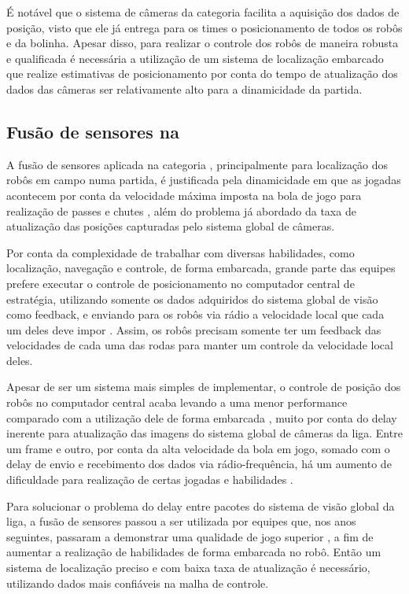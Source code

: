 \documentclass[acronym, symbols, table]{fei}
\begin{document}
			É notável que o sistema de câmeras da categoria  facilita a aquisição dos dados de posição, visto que ele já entrega para os times o posicionamento de todos os robôs e da bolinha. Apesar disso, para realizar o controle dos robôs de maneira robusta e qualificada é necessária a utilização de um sistema de localização embarcado que realize estimativas de posicionamento por conta do tempo de atualização dos dados das câmeras ser relativamente alto para a dinamicidade da partida.
			
			\subsection{Fusão de sensores na } \label{sec:fusao_sensores_ssl}
			
				A fusão de sensores aplicada na categoria , principalmente para localização dos robôs em campo numa partida, é justificada pela dinamicidade em que as jogadas acontecem por conta da velocidade máxima imposta na bola de jogo para realização de passes e chutes \cite{rules}, além do problema já abordado da taxa de atualização das posições capturadas pelo sistema global de câmeras.
				
				Por conta da complexidade de trabalhar com diversas habilidades, como localização, navegação e controle, de forma embarcada, grande parte das equipes prefere executar o controle de posicionamento no computador central de estratégia, utilizando somente os dados adquiridos do sistema global de visão como feedback, e enviando para os robôs via rádio a velocidade local que cada um deles deve impor \cite{ubc_thunderbots_2015, immortals_2023}. Assim, os robôs precisam somente ter um feedback das velocidades de cada uma das rodas para manter um controle da velocidade local deles.
				
				Apesar de ser um sistema mais simples de implementar, o controle de posição dos robôs no computador central acaba levando a uma menor performance comparado com a utilização dele de forma embarcada \cite{ubc_thunderbots_2015}, muito por conta do delay inerente para atualização das imagens do sistema global de câmeras da liga. Entre um frame e outro, por conta da alta velocidade da bola em jogo, somado com o delay de envio e recebimento dos dados via rádio-frequência, há um aumento de dificuldade para realização de certas jogadas e habilidades \cite{immortals_2023}.
				
				Para solucionar o problema do delay entre pacotes do sistema de visão global da liga, a fusão de sensores passou a ser utilizada por equipes que, nos anos seguintes, passaram a demonstrar uma qualidade de jogo superior \cite{zjunlict_2018, tigers_2013, ubc_thunderbots_2015, ubc_thunderbots_2017, immortals_2023, parsian_2015}, a fim de aumentar a realização de habilidades de forma embarcada no robô. Então um sistema de localização preciso e com baixa taxa de atualização é necessário, utilizando dados mais confiáveis na malha de controle.
				
\end{document}

